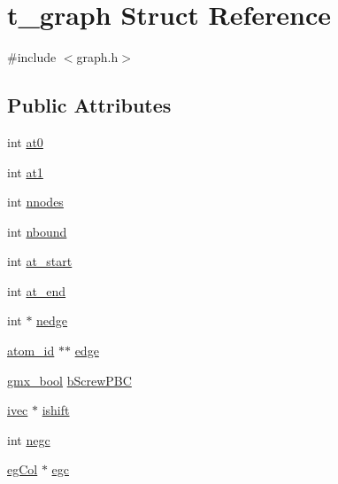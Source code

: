 \hypertarget{structt__graph}{\section{t\-\_\-graph \-Struct \-Reference}
\label{structt__graph}
}


{\ttfamily \#include $<$graph.\-h$>$}

\subsection*{\-Public \-Attributes}
\begin{DoxyCompactItemize}
\item 
int \hyperlink{structt__graph_a1daee31cfb69cc647d4d812d72df0027}{at0}
\item 
int \hyperlink{structt__graph_ad79c215f314131f4da5a5991df7eb3b5}{at1}
\item 
int \hyperlink{structt__graph_ad0f4df24b4b0ea2cefb81d5922976254}{nnodes}
\item 
int \hyperlink{structt__graph_afd266c2bacf3538fc50945d7333c4c1b}{nbound}
\item 
int \hyperlink{structt__graph_ad435f8c158f6902075cf2812f5e8b2e3}{at\-\_\-start}
\item 
int \hyperlink{structt__graph_a748ad189f6d9e20bae110f60eaa61ee3}{at\-\_\-end}
\item 
int $\ast$ \hyperlink{structt__graph_a4a04816a5412102869b6f649e1a36995}{nedge}
\item 
\hyperlink{include_2types_2simple_8h_ad3f47cdb48677e516e2049719612c737}{atom\-\_\-id} $\ast$$\ast$ \hyperlink{structt__graph_a170987df474ba11a0b222060830260e0}{edge}
\item 
\hyperlink{include_2types_2simple_8h_a8fddad319f226e856400d190198d5151}{gmx\-\_\-bool} \hyperlink{structt__graph_a7a0a4986b0d0d3637a576a12ec0dc8d2}{b\-Screw\-P\-B\-C}
\item 
\hyperlink{share_2template_2gromacs_2types_2simple_8h_a74f6ffdb4a9c1764f5293969d8c681b6}{ivec} $\ast$ \hyperlink{structt__graph_abfacf486daf890088c359619baec0093}{ishift}
\item 
int \hyperlink{structt__graph_a3caa6ae6211e73654272b81b257bb8c3}{negc}
\item 
\hyperlink{include_2types_2graph_8h_a3c403810fc841acc2bbf180fd3d4cdef}{eg\-Col} $\ast$ \hyperlink{structt__graph_a6cf964005a953b1a54e5e5bf564e1f64}{egc}
\end{DoxyCompactItemize}


